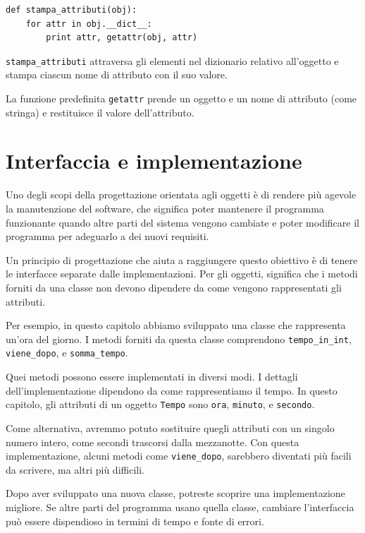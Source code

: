 \documentclass[10pt]{book}
\begin{document}
\begin{verbatim}
def stampa_attributi(obj):
    for attr in obj.__dict__:
        print attr, getattr(obj, attr)
\end{verbatim}
%
\verb"stampa_attributi" attraversa gli elementi nel dizionario relativo all'oggetto e stampa ciascun nome di attributo con il suo valore.

La funzione predefinita {\tt getattr} prende un oggetto e un nome di attributo (come stringa) e restituisce il valore dell'attributo.


\section{Interfaccia e implementazione}

Uno degli scopi della progettazione orientata agli oggetti è di rendere più agevole la manutenzione del software, che significa poter mantenere il programma funzionante quando altre parti del sistema vengono cambiate e poter modificare il programma per adeguarlo a dei nuovi requisiti.

Un principio di progettazione che aiuta a raggiungere questo obiettivo è di tenere le interfacce separate dalle implementazioni.
Per gli oggetti, significa che i metodi forniti da una classe non devono dipendere da come vengono rappresentati gli attributi.

Per esempio, in questo capitolo abbiamo sviluppato una classe che rappresenta un'ora del giorno. I metodi forniti da questa classe comprendono
\verb"tempo_in_int", \verb"viene_dopo", e \verb"somma_tempo".

Quei metodi possono essere implementati in diversi modi. I dettagli dell'implementazione dipendono da come rappresentiamo il tempo. In questo capitolo, gli attributi di un oggetto {\tt Tempo} sono {\tt ora}, {\tt minuto}, e {\tt secondo}.

Come alternativa, avremmo potuto sostituire quegli attributi con un singolo numero intero, come secondi trascorsi dalla mezzanotte. Con questa implementazione, alcuni metodi come \verb"viene_dopo", sarebbero diventati più facili da scrivere, ma altri più difficili.

Dopo aver sviluppato una nuova classe, potreste scoprire una implementazione migliore. Se altre parti del programma usano quella classe, cambiare l'interfaccia può essere dispendioso in termini di tempo e fonte di errori.  
\end{document}
